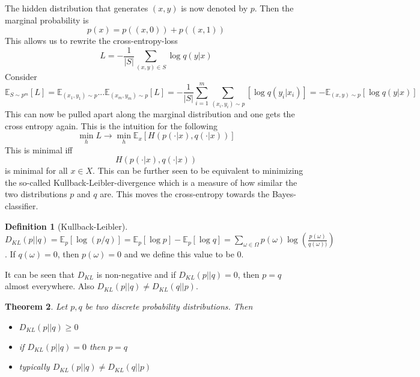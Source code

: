 \documentclass[a4paper, 12pt]{article}
\theoremstyle{plain}
\newtheorem{theorem}{Theorem}[subsection] %
\theoremstyle{definition}
\newtheorem{definition}[theorem]{Definition} %
\theoremstyle{lemma}
\theoremstyle{remark}
\theoremstyle{example}
\begin{document}
	The hidden distribution that generates $(x,y)$ is now denoted by $p$. Then the marginal probability is \[p(x) = p((x,0)) + p((x,1))\]
	This allows us to rewrite the cross-entropy-loss \[L = - \frac{1}{\left|S\right|} \sum_{(x,y) \in S} \log q(y|x)\]
	Consider \[\mathbb{E}_{S \sim p^m} [L] = \mathbb{E}_{(x_1,y_1) \sim p} ... \mathbb{E}_{(x_m,y_m)\sim p} [L] = - \frac{1}{\left|S\right|} \sum_{i=1}^m \sum_{(x_i,y_i) \sim p} [\log q(y_i|x_i)] = - \mathbb{E}_{(x,y) \sim p}[\log q(y|x)]\]
	This can now be pulled apart along the marginal distribution and one gets the cross entropy again. This is the intuition for the following \[\min_h L \to \min_h \mathbb{E}_x[H(p(\cdot | x), q(\cdot |x))]\] This is minimal iff \[H(p(\cdot | x), q(\cdot |x))\] is minimal for all $x\in X$. This can be further seen to be equivalent to minimizing the so-called Kullback-Leibler-divergence which is a measure of how similar the two distributions $p$ and $q$ are. This moves the cross-entropy towards the Bayes-classifier.
	\begin{definition}[Kullback-Leibler]
		$D_{KL}(p||q) = \mathbb{E}_p[\log(p/q)] = \mathbb{E}_p[\log p] - \mathbb{E}_p[\log q] = \sum_{\omega \in \Omega} p(\omega) \log(\frac{p(\omega)}{q(\omega))})$. If $q(\omega) = 0$, then $p(\omega) = 0$ and we define this value to be 0.
	\end{definition}
	It can be seen that $D_{KL}$ is non-negative and if $D_{KL}(p||q) = 0$, then $p=q$ almost everywhere. Also $D_{KL} (p||q)\neq D_{KL}(q||p)$. 
	\begin{theorem}
		Let $p,q$ be two discrete probability distributions. Then \begin{itemize}
			\item $D_{KL}(p||q) \geq 0$
			\item if $D_{KL}(p||q) = 0$ then $p=q$
			\item typically $D_{KL}(p||q) \neq D_{KL}(q||p)$
		\end{itemize}
	\end{theorem}
\end{document}
